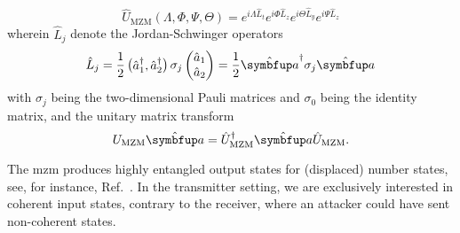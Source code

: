 \begin{equation}
	\hat{U}_\text{MZM}(\Lambda,\Phi,\Psi,\Theta)
	=
	e^{i\Lambda\hat{L}_t}
	e^{i\Phi\hat{L}_z}
	e^{i\Theta\hat{L}_y}
	e^{i\Psi\hat{L}_z}
	\label{eq:mzm_operator}
\end{equation}
wherein $\hat{L}_j$ denote the Jordan-Schwinger operators~\cite[p.~97]{Leonhardt2010}
\begin{equation}
	\hat{L}_j
	=
	\frac{1}{2}
	\begin{pmatrix}
		\hat{a}_1^\dagger, \hat{a}_2^\dagger
	\end{pmatrix}
	\sigma_j
	\begin{pmatrix}
		\hat{a}_1 \\
		\hat{a}_2
	\end{pmatrix}
	=
	\frac{1}{2}
	\hat{\vb{a}}^\dagger
	\sigma_j
	\hat{\vb{a}}
\end{equation}
with $\sigma_j$ being the two-dimensional Pauli matrices and $\sigma_0$ being the identity matrix, and the unitary matrix transform
\begin{equation}
	U_\text{MZM}
	\hat{\vb{a}}
	=
	\hat{U}_\text{MZM}^\dagger
	\hat{\vb{a}}
	\hat{U}_\text{MZM}
	.
\end{equation}

The \gls{mzm} produces highly entangled output states for (displaced) number states, see, for instance, Ref.~\cite{Windhager2011}.
In the transmitter setting, we are exclusively interested in coherent input states, contrary to the receiver, where an attacker could have sent non-coherent states.

